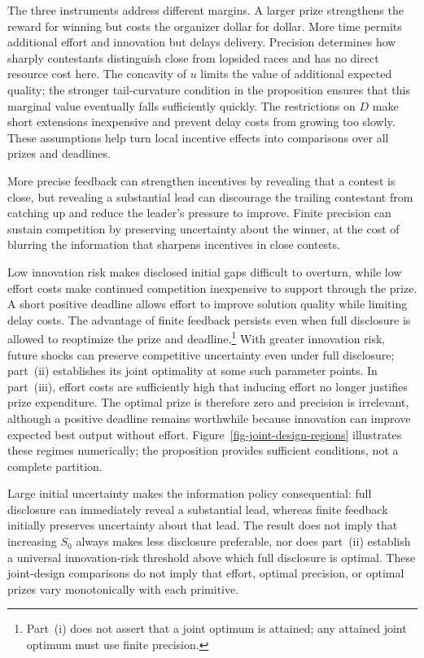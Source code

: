 \documentclass[mnsc]{informs3}
\begin{document}
The three instruments address different margins. A larger prize strengthens the reward for winning but costs the organizer dollar for dollar. More time permits additional effort and innovation but delays delivery. Precision determines how sharply contestants distinguish close from lopsided races and has no direct resource cost here. The concavity of $u$ limits the value of additional expected quality; the stronger tail-curvature condition in the proposition ensures that this marginal value eventually falls sufficiently quickly. The restrictions on $D$ make short extensions inexpensive and prevent delay costs from growing too slowly. These assumptions help turn local incentive effects into comparisons over all prizes and deadlines.

More precise feedback can strengthen incentives by revealing that a contest is close, but revealing a substantial lead can discourage the trailing contestant from catching up and reduce the leader's pressure to improve. Finite precision can sustain competition by preserving uncertainty about the winner, at the cost of blurring the information that sharpens incentives in close contests.

Low innovation risk makes disclosed initial gaps difficult to overturn, while low effort costs make continued competition inexpensive to support through the prize. A short positive deadline allows effort to improve solution quality while limiting delay costs. The advantage of finite feedback persists even when full disclosure is allowed to reoptimize the prize and deadline.\footnote{Part~(i) does not assert that a joint optimum is attained; any attained joint optimum must use finite precision.} With greater innovation risk, future shocks can preserve competitive uncertainty even under full disclosure; part~(ii) establishes its joint optimality at some such parameter points. In part~(iii), effort costs are sufficiently high that inducing effort no longer justifies prize expenditure. The optimal prize is therefore zero and precision is irrelevant, although a positive deadline remains worthwhile because innovation can improve expected best output without effort. Figure~\ref{fig-joint-design-regions} illustrates these regimes numerically; the proposition provides sufficient conditions, not a complete partition.

Large initial uncertainty makes the information policy consequential: full disclosure can immediately reveal a substantial lead, whereas finite feedback initially preserves uncertainty about that lead. The result does not imply that increasing $S_0$ always makes less disclosure preferable, nor does part~(ii) establish a universal innovation-risk threshold above which full disclosure is optimal. These joint-design comparisons do not imply that effort, optimal precision, or optimal prizes vary monotonically with each primitive.
\end{document}
